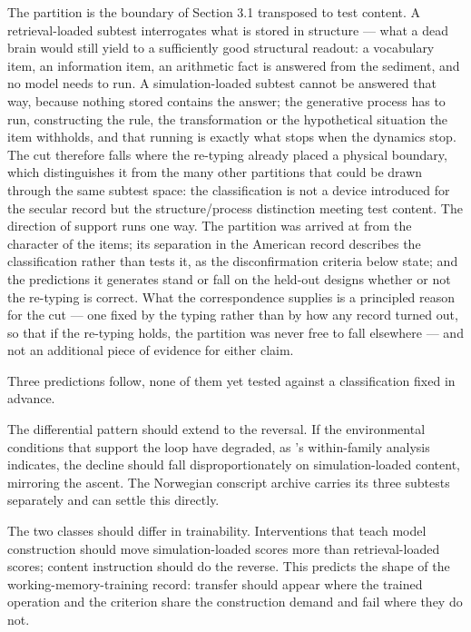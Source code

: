 \documentclass[12pt,a4paper]{article}
\begin{document}
The partition is the boundary of Section 3.1 transposed to test content. A retrieval-loaded subtest interrogates what is stored in structure ---\hspace{0pt} what a dead brain would still yield to a sufficiently good structural readout: a vocabulary item, an information item, an arithmetic fact is answered from the sediment, and no model needs to run. A simulation-loaded subtest cannot be answered that way, because nothing stored contains the answer; the generative process has to run, constructing the rule, the transformation or the hypothetical situation the item withholds, and that running is exactly what stops when the dynamics stop. The cut therefore falls where the re-typing already placed a physical boundary, which distinguishes it from the many other partitions that could be drawn through the same subtest space: the classification is not a device introduced for the secular record but the structure/process distinction meeting test content. The direction of support runs one way. The partition was arrived at from the character of the items; its separation in the American record describes the classification rather than tests it, as the disconfirmation criteria below state; and the predictions it generates stand or fall on the held-out designs whether or not the re-typing is correct. What the correspondence supplies is a principled reason for the cut ---\hspace{0pt} one fixed by the typing rather than by how any record turned out, so that if the re-typing holds, the partition was never free to fall elsewhere ---\hspace{0pt} and not an additional piece of evidence for either claim.

Three predictions follow, none of them yet tested against a classification fixed in advance.

The differential pattern should extend to the reversal. If the environmental conditions that support the loop have degraded, as \citeauthor{BratsbergRogeberg2018}'s \citeyearpar{BratsbergRogeberg2018} within-family analysis indicates, the decline should fall disproportionately on simulation-loaded content, mirroring the ascent. The Norwegian conscript archive carries its three subtests separately and can settle this directly.

The two classes should differ in trainability. Interventions that teach model construction should move simulation-loaded scores more than retrieval-loaded scores; content instruction should do the reverse. This predicts the shape of the working-memory-training record: transfer should appear where the trained operation and the criterion share the construction demand and fail where they do not.
\end{document}
